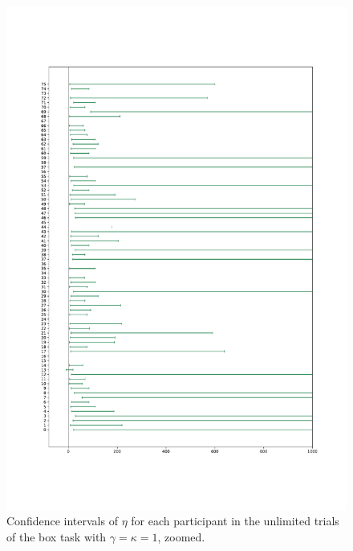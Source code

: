 \begin{figure}
    \centering
    \includegraphics[scale=0.37]{pictures/all_cis_unlim_eta_zoomed_pdf.pdf}
    \caption[CIs for $\eta$ zoomed, unlimited. $\gamma=\kappa=1$]{Confidence intervals of $\eta$ for each participant in the unlimited trials of the box task with $\gamma=\kappa=1$, zoomed.}
    \label{fig:all_cis_eta_unlim_zoomed}
\end{figure}


